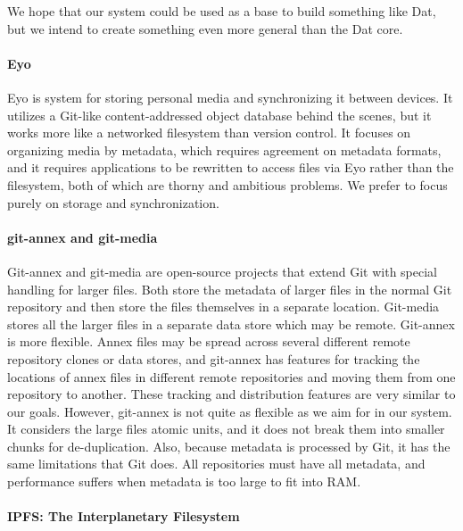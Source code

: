 \documentclass[12pt,a4paper,two-side]{book}
\begin{document}
We hope that our system could be used as a base to build something like Dat, but
we intend to create something even more general than the Dat core.


\paragraph{Eyo}

Eyo \cite{Strauss:2011:EDP:2002181.2002216} is system for storing personal media
and synchronizing it between devices. It utilizes a Git-like content-addressed
object database behind the scenes, but it works more like a networked filesystem
than version control. It focuses on organizing media by metadata, which requires
agreement on metadata formats, and it requires applications to be rewritten to
access files via Eyo rather than the filesystem, both of which are thorny and
ambitious problems. We prefer to focus purely on storage and synchronization.


\paragraph{git-annex and git-media}

Git-annex \cite{git_annex_homepage} and git-media \cite{git_media_github} are
open-source projects that extend Git with special handling for larger files.
Both store the metadata of larger files in the normal Git repository and then
store the files themselves in a separate location. Git-media stores all the
larger files in a separate data store which may be remote. Git-annex is more
flexible. Annex files may be spread across several different remote repository
clones or data stores, and git-annex has features for tracking the locations of
annex files in different remote repositories and moving them from one repository
to another. These tracking and distribution features are very similar to our
goals. However, git-annex is not quite as flexible as we aim for in our system.
It considers the large files atomic units, and it does not break them into
smaller chunks for de-duplication. Also, because metadata is processed by Git,
it has the same limitations that Git does. All repositories must have all
metadata, and performance suffers when metadata is too large to fit into RAM.


\paragraph{IPFS: The Interplanetary Filesystem}
\end{document}
